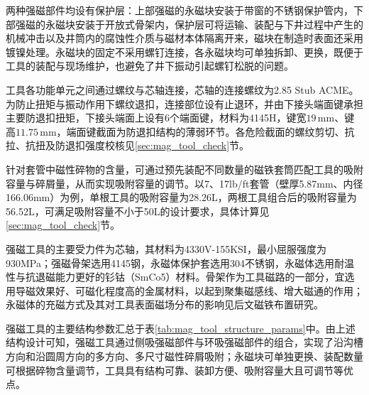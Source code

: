 两种强磁部件均设有保护层：上部强磁的永磁块安装于带窗的不锈钢保护管内，下部强磁的永磁块安装于开放式骨架内，保护层可将运输、装配与下井过程中产生的机械冲击以及井筒内的腐蚀性介质与磁材本体隔离开来，磁块在制造时表面还采用镀镍处理。永磁块的固定不采用螺钉连接，各永磁块均可单独拆卸、更换，既便于工具的装配与现场维护，也避免了井下振动引起螺钉松脱的问题。

工具各功能单元之间通过螺纹与芯轴连接，芯轴的连接螺纹为2.85 Stub ACME。为防止扭矩与振动作用下螺纹退扣，连接部位设有止退环，并由下接头端面键承担主要防退扣扭矩，下接头端面上设有6个端面键，材料为4145H，键宽$19\,\text{mm}$、键高$11.75\,\text{mm}$，端面键截面为防退扣结构的薄弱环节。各危险截面的螺纹剪切、抗拉、抗扭及防退扣强度校核见\ref{sec:mag_tool_check}节。

针对套管中磁性碎物的含量，可通过预先装配不同数量的磁铁套筒匹配工具的吸附容量与碎屑量，从而实现吸附容量的调节。以7\inch、17lb/ft套管（壁厚5.87mm、内径166.06mm）为例，单根工具的吸附容量为28.26L，两根工具组合后的吸附容量为56.52L，可满足吸附容量不小于50L的设计要求，具体计算见\ref{sec:mag_tool_check}节。

强磁工具的主要受力件为芯轴，其材料为4330V-155KSI，最小屈服强度为930MPa；强磁骨架选用4145钢，永磁体保护套选用304不锈钢，永磁体选用耐温性与抗退磁能力更好的钐钴（SmCo5）材料。骨架作为工具磁路的一部分，宜选用导磁效果好、可磁化程度高的金属材料，以起到聚集磁感线、增大磁通的作用；永磁体的充磁方式及其对工具表面磁场分布的影响见后文磁铁布置研究。

强磁工具的主要结构参数汇总于表\ref{tab:mag_tool_structure_params}中。由上述结构设计可知，强磁工具通过侧吸强磁部件与环吸强磁部件的组合，实现了沿沟槽方向和沿圆周方向的多方向、多尺寸磁性碎屑吸附；永磁块可单独更换、装配数量可根据碎物含量调节，工具具有结构可靠、装卸方便、吸附容量大且可调节等优点。

